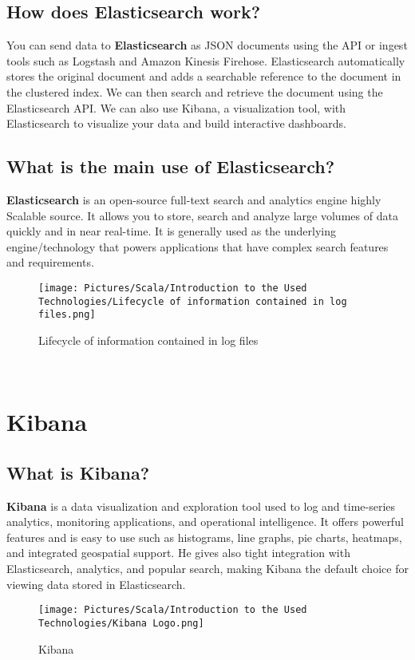 \begin{spacing}{1.5}
\subsection{How does Elasticsearch work?}
\par You can send data to \textbf{Elasticsearch} as JSON documents using the API or ingest tools such as Logstash and Amazon Kinesis Firehose. Elasticsearch automatically stores the original document and adds a searchable reference to the document in the clustered index. We can then
search and retrieve the document using the Elasticsearch API. We can also use Kibana, a visualization tool, with Elasticsearch to visualize your data and build interactive dashboards.
\\

\subsection{What is the main use of Elasticsearch?}
\par \textbf{Elasticsearch} is an open-source full-text search and analytics engine highly Scalable source. It allows you to store, search and analyze large volumes of data quickly and in near real-time. It is generally
used as the underlying engine/technology that powers applications that have complex search features and requirements.
\\
\begin{figure}[!htb] 
\begin{center} 
\texttt{[image: Pictures/Scala/Introduction to the Used Technologies/Lifecycle of information contained in log files.png]}
\end{center} 
\caption{Lifecycle of information contained in log files} 
\end{figure}  \FloatBarrier
\\

\newpage

\section{Kibana} 
 \subsection{What is Kibana?}
 \par  \textbf{Kibana} is a data visualization and exploration tool used to log and time-series analytics, monitoring
applications, and operational intelligence. It offers powerful features and is easy to use such as histograms, line graphs, pie charts, heatmaps, and integrated geospatial support. He gives
also tight integration with Elasticsearch, analytics, and popular search, making Kibana the default choice for viewing data stored in Elasticsearch.
\begin{figure}[!htb] 
\begin{center} 
\texttt{[image: Pictures/Scala/Introduction to the Used Technologies/Kibana Logo.png]}
\end{center} 
\caption{Kibana} 
\end{figure}  \FloatBarrier


\end{spacing}
